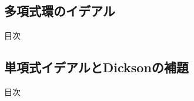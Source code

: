 \documentclass[aspectratio=169, dvipdfmx, 11pt]{beamer} %
\begin{document}
%
%
%

\subsection{多項式環のイデアル}
\begin{frame}{目次}
	\tableofcontents[currentsubsection]
\end{frame}



\subsection{単項式イデアルとDicksonの補題}
\begin{frame}{目次}
	\tableofcontents[currentsubsection]
\end{frame}


\end{document}
